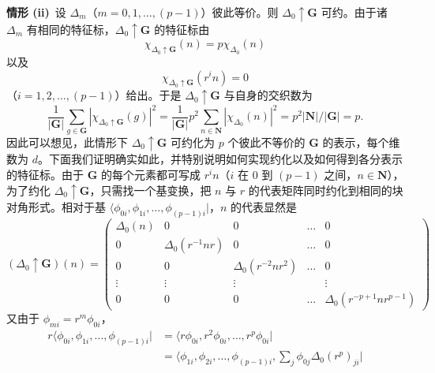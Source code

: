 \noindent\textbf{情形 (ii)}\ 设 $\Delta_{m}$（$m = 0, 1, \dots, (p-1)$）彼此等价。则 $\Delta_{0} \uparrow \mathbf{G}$ 可约。由于诸 $\Delta_{m}$ 有相同的特征标，$\Delta_{0} \uparrow \mathbf{G}$ 的特征标由
\begin{equation*}
\chi_{\Delta_{0} \uparrow \mathbf{G}}(n) = p\chi_{\Delta_{0}}(n)
\tag{4.5.24}
\end{equation*}
以及
\begin{equation*}
\chi_{\Delta_{0} \uparrow \mathbf{G}}(r^{i}n) = 0
\tag{4.5.25}
\end{equation*}
（$i = 1, 2, \dots, (p-1)$）给出。于是 $\Delta_{0} \uparrow \mathbf{G}$ 与自身的交织数为
\begin{equation*}
\frac{1}{|\mathbf{G}|}\sum_{g \in \mathbf{G}}\left|\chi_{\Delta_{0} \uparrow \mathbf{G}}(g)\right|^{2} = \frac{1}{|\mathbf{G}|}p^{2}\sum_{n \in \mathbf{N}}\left|\chi_{\Delta_{0}}(n)\right|^{2} = p^{2}|\mathbf{N}|/|\mathbf{G}| = p.
\tag{4.5.26}
\end{equation*}
因此可以想见，此情形下 $\Delta_{0} \uparrow \mathbf{G}$ 可约化为 $p$ 个彼此不等价的 $\mathbf{G}$ 的表示，每个维数为 $d$。下面我们证明确实如此，并特别说明如何实现约化以及如何得到各分表示的特征标。由于 $\mathbf{G}$ 的每个元素都可写成 $r^{i}n$（$i$ 在 0 到 $(p-1)$ 之间，$n \in \mathbf{N}$），为了约化 $\Delta_{0} \uparrow \mathbf{G}$，只需找一个基变换，把 $n$ 与 $r$ 的代表矩阵同时约化到相同的块对角形式。相对于基 $\langle \phi_{0i}, \phi_{1i}, \dots, \phi_{(p-1)i} |$，$n$ 的代表显然是
\begin{equation*}
(\Delta_{0} \uparrow \mathbf{G})(n) = \begin{pmatrix} \Delta_{0}(n) & 0 & 0 & \dots & 0\\ 0 & \Delta_{0}(r^{-1}nr) & 0 & \dots & 0\\ 0 & 0 & \Delta_{0}(r^{-2}nr^{2}) & \dots & 0\\ \vdots & \vdots & \vdots & & \vdots\\ 0 & 0 & 0 & \dots & \Delta_{0}(r^{-p+1}nr^{p-1}) \end{pmatrix}
\tag{4.5.27}
\end{equation*}
又由于 $\phi_{mi} = r^{m}\phi_{0i}$，
\begin{equation*}
\begin{aligned}
r\langle \phi_{0i}, \phi_{1i}, \dots, \phi_{(p-1)i} | &= \langle r\phi_{0i}, r^{2}\phi_{0i}, \dots, r^{p}\phi_{0i} |\\
&= \langle \phi_{1i}, \phi_{2i}, \dots, \phi_{(p-1)i}, \sum_{j}\phi_{0j}\Delta_{0}(r^{p})_{ji} |
\end{aligned}
\tag{4.5.28}
\end{equation*}
